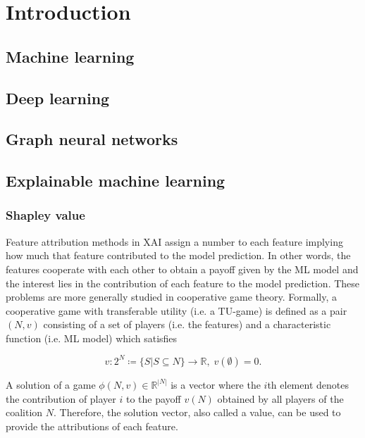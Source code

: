 \chapter{Introduction}


\section{Machine learning}

\section{Deep learning}


\section{Graph neural networks}


\section{Explainable machine learning}

\subsection{Shapley value}

Feature attribution methods in XAI assign a number to each feature implying how 
much that feature contributed to the model prediction.\cite{merrick2020explanation} 
In other words, the features cooperate with each other to obtain a payoff given 
by the ML model and the interest lies in the contribution of each feature to the 
model prediction. These problems are more generally studied in cooperative game 
theory. Formally, a cooperative game with transferable utility (i.e. a TU-game) is 
defined as a pair $(N, v)$ consisting of a set of players (i.e. the features) 
and a characteristic function (i.e. ML model) which satisfies\cite{zhang2022gstarx}


\begin{equation}
	v: 2^N \coloneqq \{S | S \subseteq N\} \rightarrow \mathbb{R}, \; v\left(\emptyset\right) = 0.
\end{equation}

A solution of a game $\phi(N, v) \in \mathbb{R}^{|N|}$ is a vector where the $i$th element 
denotes the contribution of player $i$ to the payoff $v(N)$ obtained by all players 
of the coalition $N$.\cite{zhang2022gstarx} Therefore, the solution vector, 
also called a value, can be used to provide the attributions of each feature. 

